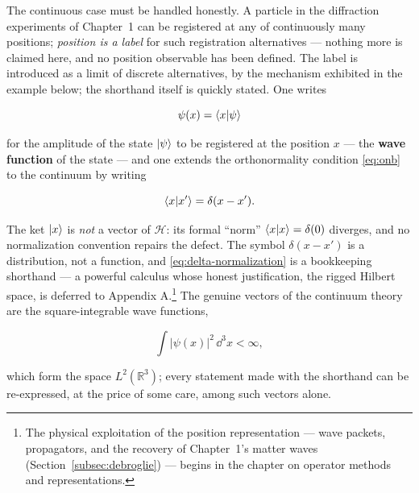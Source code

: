 The continuous case must be handled honestly. A particle in the diffraction experiments of Chapter~1 can be registered at any of continuously many positions; \emph{position is a label} for such registration alternatives --- nothing more is claimed here, and no position observable has been defined. The label is introduced as a limit of discrete alternatives, by the mechanism exhibited in the example below; the shorthand itself is quickly stated. One writes
\begin{linenomath}
    \begin{equation}
        \psi(x)=\braket{x|\psi}
        \label{eq:wavefunction}
    \end{equation}
\end{linenomath}
for the amplitude of the state $\ket{\psi}$ to be registered at the position $x$ --- the \textbf{wave function} of the state --- and one extends the orthonormality condition \eqref{eq:onb} to the continuum by writing
\begin{linenomath}
    \begin{equation}
        \braket{x|x'}=\delta(x-x').
        \label{eq:delta-normalization}
    \end{equation}
\end{linenomath}
\begin{note}
The ket $\ket{x}$ is \emph{not} a vector of $\mathcal{H}$: its formal ``norm'' $\braket{x|x}=\delta(0)$ diverges, and no normalization convention repairs the defect. The symbol $\delta(x-x')$ is a distribution, not a function, and \eqref{eq:delta-normalization} is a bookkeeping shorthand --- a powerful calculus whose honest justification, the rigged Hilbert space, is deferred to Appendix A.\footnote{The physical exploitation of the position representation --- wave packets, propagators, and the recovery of Chapter~1's matter waves (Section~\ref{subsec:debroglie}) --- begins in the chapter on operator methods and representations.} The genuine vectors of the continuum theory are the square-integrable wave functions,
\begin{linenomath}
    \begin{equation}
        \int|\psi(x)|^2\,\dd^3 x<\infty,
        \label{eq:l2}
    \end{equation}
\end{linenomath}
which form the space $L^2(\mathbb{R}^3)$; every statement made with the shorthand can be re-expressed, at the price of some care, among such vectors alone.
\end{note}

